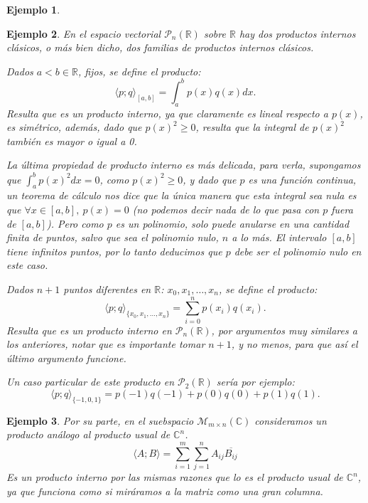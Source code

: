 \documentclass[12pt]{book}
\newtheorem{ejem}{Ejemplo}
\def\R{\mathbb{R}}
\def\C{\mathbb{C}}
\def\M{\mathcal{M}}
\def\P{\mathcal{P}}
\begin{document}
{\begin{ejem}
{    
    }
\end{ejem}

\vspace{0.3 cm}
\begin{ejem} {\em
En el espacio vectorial $\P_n(\R)$ sobre $\R$ hay dos productos internos clásicos, o más bien dicho, dos familias de productos internos clásicos.
\begin{item}
\item Dados $a<b\in\R$, fijos, se define el producto:
$$\langle p;q\rangle_{[a,b]}=\int_a^bp(x)q(x)dx.$$
Resulta que es un producto interno, ya que claramente es lineal respecto a $p(x)$, es simétrico, además, dado que $p(x)^2\ge 0$, resulta que la integral de $p(x)^2$ también es mayor o igual a 0.

La última propiedad de producto interno es más delicada, para verla, supongamos que $\int_a^b p(x)^2 dx=0$, como $p(x)^2\ge 0$, y dado que $p$ es una función continua, un teorema de cálculo nos dice que la única manera que esta integral sea nula es que $\forall x\in[a,b],\ p(x)=0$ (no podemos decir nada de lo que pasa con $p$ fuera de $[a,b]$).
Pero como $p$ es un polinomio, solo puede anularse en una cantidad finita de puntos, salvo que sea el polinomio nulo, $n$ a lo más.
El intervalo $[a,b]$ tiene infinitos puntos, por lo tanto deducimos que $p$ debe ser el polinomio nulo en este caso.
\item Dados $n+1$ puntos diferentes en $\R$: $x_0,x_1,\dots,x_n$, se define el producto:
$$\langle p;q\rangle_{\{x_0,x_1,\dots,x_n\}}=\sum_{i=0}^np(x_i)q(x_i).$$
Resulta que es un producto interno en $\P_n(\R)$, por argumentos muy similares a los anteriores, notar que es importante tomar $n+1$, y no menos, para que así el último argumento funcione.

Un caso particular de este producto en $\P_2(\R)$ sería por ejemplo:
$$\langle p;q\rangle_{\{-1,0,1\}}=p(-1)q(-1)+p(0)q(0)+p(1)q(1).$$
\end{item}
}
\end{ejem}

\begin{ejem} {\em
Por su parte,  en el suebspacio $\M_{m\times n}(\C)$ consideramos un producto análogo al producto usual de $\C^n$.
$$\langle A;B\rangle=\sum_{i=1}^m\sum_{j=1}^n A_{ij}\overline{B_{ij}}$$
Es un producto interno por las mismas razones que lo es el producto usual de $\C^n$, ya que funciona como si miráramos a la matriz como una gran columna.

}
\end{ejem}}
\end{document}
